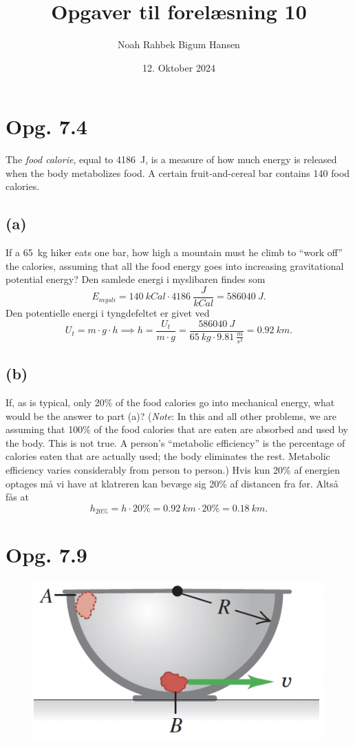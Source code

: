 \documentclass[12pt]{article}
\title{Opgaver til forelæsning 10}
\author{Noah Rahbek Bigum Hansen}
\date{12. Oktober 2024}
\begin{document}
\maketitle

\section*{Opg. 7.4}
The \textit{food calorie}, equal to \qty{4186}{J}, is a measure of how much energy is released when the body metabolizes food. A certain fruit-and-cereal bar contains \num{140} food calories. 

\subsection*{(a)}
If a \qty{65}{kg} hiker eats one bar, how high a mountain must he climb to “work off” the calories, assuming that all the food energy goes into increasing gravitational potential energy?
\bigbreak
Den samlede energi i myslibaren findes som
\[
  E_{mysli} = \qty{140}{kCal} \cdot \qty{4186}{\frac{J}{kCal}} = \qty{586040}{J}
.\] 
Den potentielle energi i tyngdefeltet er givet ved
\[
U_t = m\cdot g\cdot h \implies h = \frac{U_t}{m\cdot g} = \frac{\qty{586040}{J}}{\qty{65}{kg}\cdot \qty{9,81}{\frac{m}{s^2}}} = \qty{0,92}{km}
.\]

\subsection*{(b)}
If, as is typical, only \num{20}\% of the food calories go into mechanical energy, what would be the answer to part (a)? (\textit{Note}: In this and all other problems, we are assuming that \num{100}\% of the food calories that are eaten are absorbed and used by the body. This is not true. A person’s “metabolic efficiency” is the percentage of calories eaten that are actually used; the body eliminates the rest. Metabolic efficiency varies considerably from person to person.)
\bigbreak
Hvis kun 20\% af energien optages må vi have at klatreren kan bevæge sig 20\% af distancen fra før. Altså fås at
\[
h_{20\%} = h\cdot 20\% = \qty{0,92}{km}\cdot 20\% = \qty{0,18}{km}
.\] 
  

\section*{Opg. 7.9}

\begin{figure} [ht]
  \centering
  \caption{}
  \includegraphics[width=0.5\linewidth]{../figures/E7_9.png}
  \label{fig:E7_9}
\end{figure}
\end{document}
